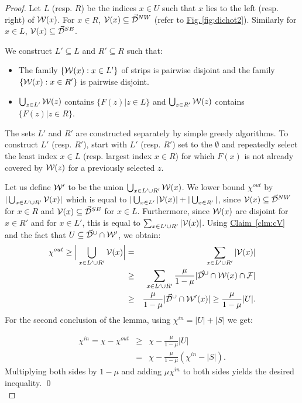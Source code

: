 \documentclass{acmsmall}
\newcommand{\cD}{{\cal D}}
\newcommand{\cF}{{\cal F}}
\newcommand{\cR}{{\cal R}}
\newcommand{\cV}{{\cal V}}
\newcommand{\cW}{{\cal W}}
\newcommand{\Fig}[1]{\hyperref[fig:#1]{Fig.\,\ref*{fig:#1}}} %
\newcommand{\Clm}[1]{\hyperref[clm:#1]{Claim~\ref*{clm:#1}}} %
\begin{document}
\begin{proof}
Let $L$ (resp. $R$) be the indices $x \in U$ such that $x$ lies to the left (resp. right) of  $\cW(x)$. 
For $x \in R$, $\cV(x) \subseteq \vec{\cD}^{NW}$ (refer to \Fig{dichot2}).
Similarly for $x \in L$, $\cV(x) \subseteq \vec{\cD}^{SE}$.  

We construct  $L' \subseteq L$ and $R' \subseteq R$
such that:

\begin{itemize}
\item The family   $\{\cW(x):x \in L'\}$ of strips 
is pairwise disjoint and the 
family $\{\cW(x):x \in R'\}$ 
is pairwise disjoint.
\item $\bigcup_{z \in L'} \cW(z)$ contains $\{F(z) | z \in L\}$
and $\bigcup_{z \in R'} \cW(z)$ contains $\{F(z) | z \in R\}$. 
\end{itemize}

The sets $L'$ and $R'$ are constructed separately by simple greedy algorithms.  To construct $L'$ (resp. $R'$), start with $L'$ (resp. $R'$) set to
the $\emptyset$ and repeatedly select
the least index $x \in L$ (resp. largest index $x \in R$) for which $F(x)$ is not already covered by $\cW(z)$ for a previously selected $z$.

Let us define $\cW'$ to be the union $\bigcup_{x \in L' \cup R'} \cW(x)$.
We lower bound $\chi^{out}$ by  $|\bigcup_{x \in L' \cup R'} \cV(x)|$ which is equal to $|\bigcup_{x \in L'}|\cV(x)|+|\bigcup_{x \in R'}|$, since  $\cV(x) \subseteq \vec{\cD}^{NW}$ for $x \in R$ and   $\cV(x) \subseteq \vec{\cD}^{SE}$ for $x \in L$. 
Furthermore, since
$\cW(x)$ are disjoint for $x \in R'$ and for $x \in L'$, this is equal to $\sum_{x \in L' \cup R'}|\cV(x)|$.
Using   \Clm{cV} 
and the fact that $U \subseteq \vec{\cD}^\cup \cap \cW'$, we obtain:
\begin{eqnarray*}
\chi^{out} \geq \Big|\bigcup_{x \in L' \cup R'} \cV(x) \Big|& = &
\sum_{x \in L' \cup R'} |\cV(x)| \\
 &  \geq & \sum_{x \in L' \cup R'}\frac{\mu}{1-\mu}|\vec{\cD}^{\cup} \cap \cW(x) \cap \cF|\\
& \geq & \frac{\mu}{1-\mu}|\vec{\cD}^{\cup} \cap \cW'(x)| \geq \frac{\mu}{1-\mu}|U|.
\end{eqnarray*} 
%
For the second conclusion of the lemma, using  $\chi^{in}= |U|+|S|$ we get:

\begin{eqnarray*}
\chi^{in} = \chi - \chi^{out} & \geq & \chi - \frac{\mu}{1-\mu}|U| \\
& = & \chi - \frac{\mu}{1-\mu} (\chi^{in} - |S|).
\end{eqnarray*}
Multiplying both sides by $1-\mu$ and adding $\mu \chi^{in}$ to both sides yields the desired inequality.
\qed\\
\end{proof}
\end{document}

